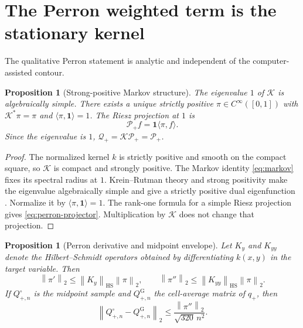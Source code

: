 \documentclass[11pt]{article}
\newtheorem{proposition}[theorem]{Proposition}
\theoremstyle{definition}
\theoremstyle{remark}
\newcommand{\cK}{\mathcal K}
\newcommand{\cP}{\mathcal P}
\newcommand{\cQ}{\mathcal Q}
\newcommand{\norm}[1]{\left\lVert #1\right\rVert}
\begin{document}
\section{The Perron weighted term is the stationary kernel}
\label{sec:perron-structure}

The qualitative Perron statement is analytic and independent of the
computer-assisted contour.

\begin{proposition}[Strong-positive Markov structure]
\label{prop:positive-perron}
The eigenvalue $1$ of $\cK$ is algebraically simple.  There exists a unique
strictly positive $\pi\in C^\infty([0,1])$ with
$\cK^*\pi=\pi$ and $\langle\pi,\mathbf1\rangle=1$.  The Riesz projection
at $1$ is
\begin{equation}
 \cP_+f=\mathbf1\langle\pi,f\rangle.
 \label{eq:perron-projector}
\end{equation}
Since the eigenvalue is $1$, $\cQ_+=\cK\cP_+=\cP_+$.
\end{proposition}

\begin{proof}
The normalized kernel $k$ is strictly positive and smooth on the compact
square, so $\cK$ is compact and strongly positive.  The Markov identity
\eqref{eq:markov} fixes its spectral radius at $1$.  Krein--Rutman theory and
strong positivity make the eigenvalue algebraically simple and give a
strictly positive dual eigenfunction
\citep{Schaefer1974,Kato1995}.  Normalize it by
$\langle\pi,\mathbf1\rangle=1$.  The rank-one formula for a simple Riesz
projection gives \eqref{eq:perron-projector}.  Multiplication by $\cK$
does not change that projection.
\end{proof}

\begin{proposition}[Perron derivative and midpoint envelope]
\label{prop:perron-envelope}
Let $K_y$ and $K_{yy}$ denote the Hilbert--Schmidt operators obtained by
differentiating $k(x,y)$ in the target variable.  Then
\begin{equation}
 \norm{\pi'}_2\le\norm{K_y}_{\mathrm{HS}}\norm{\pi}_2,
 \qquad
 \norm{\pi''}_2\le\norm{K_{yy}}_{\mathrm{HS}}\norm{\pi}_2.
 \label{eq:pi-derivative}
\end{equation}
If $Q_{+,n}^\circ$ is the midpoint sample and $Q_{+,n}^{\mathrm G}$ the
cell-average matrix of $q_+$, then
\begin{equation}
 \norm{Q_{+,n}^\circ-Q_{+,n}^{\mathrm G}}_2
 \le\frac{\norm{\pi''}_2}{\sqrt{320}\,n^2}.
 \label{eq:perron-midpoint-bound}
\end{equation}
\end{proposition}
\end{document}
